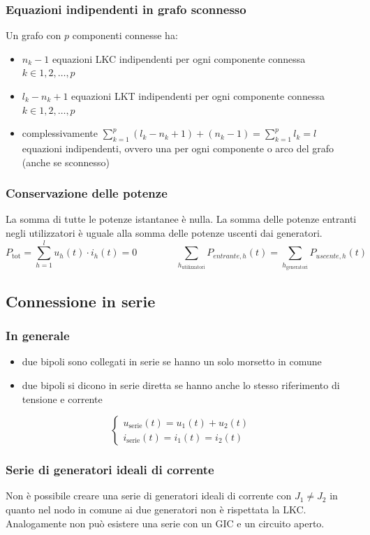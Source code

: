 \documentclass[a4paper]{article}
\begin{document}
\subsubsection*{Equazioni indipendenti in grafo sconnesso}
Un grafo con \(p\) componenti connesse ha:
\begin{itemize}
	\item \(n_k-1\) equazioni LKC indipendenti per ogni componente connessa \(k \in 1,2,\dots,p\)
	\item \(l_k-n_k+1\) equazioni LKT indipendenti per ogni componente connessa \(k \in 1,2,\dots,p\)
	\item complessivamente \(\sum_{k=1}^p (l_k-n_k+1)+(n_k-1) = \sum_{k=1}^p l_k = l\) equazioni indipendenti, ovvero una per ogni
	componente o arco del grafo (anche se sconnesso)
\end{itemize}

\subsubsection*{Conservazione delle potenze}
La somma di tutte le potenze istantanee è nulla. La somma delle potenze entranti negli utilizzatori è uguale alla somma delle
potenze uscenti dai generatori.
\[P_\text{tot} = \sum_{h=1}^{l} u_h(t) \cdot i_h(t) = 0 \qquad\qquad \sum_{h_\text{utilizzatori}} P_{entrante,h}(t) = \sum_{h_\text{generatori}} P_{uscente,h}(t)\]

\subsection{Connessione in serie}
\subsubsection*{In generale}
\begin{itemize}
	\item due bipoli sono collegati in serie se hanno un solo morsetto in comune
	\item due bipoli si dicono in serie diretta se hanno anche lo stesso riferimento di tensione e corrente
\end{itemize}
\[\begin{cases} u_\text{serie}(t) = u_1(t) + u_2(t) \\ i_\text{serie}(t) = i_1(t) = i_2(t) \end{cases}\]

\subsubsection*{Serie di generatori ideali di corrente}
Non è possibile creare una serie di generatori ideali di corrente con \(J_1 \neq J_2\) in quanto nel nodo in comune ai due
generatori non è rispettata la LKC. Analogamente non può esistere una serie con un GIC e un circuito aperto.
\end{document}

